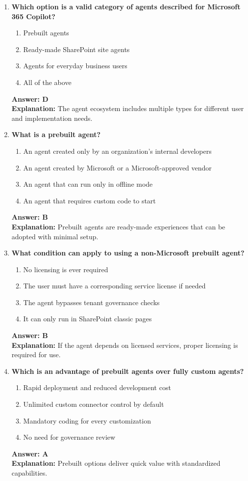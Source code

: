 \documentclass[10pt]{article}
\begin{document}
\begin{enumerate}[leftmargin=*]
\item \textbf{Which option is a valid category of agents described for Microsoft 365 Copilot?}
\begin{enumerate}[label=\Alph*.]
  \item Prebuilt agents
  \item Ready-made SharePoint site agents
  \item Agents for everyday business users
  \item All of the above
\end{enumerate}
\textbf{Answer: D}\\
\textbf{Explanation:} The agent ecosystem includes multiple types for different user and implementation needs.

\item \textbf{What is a prebuilt agent?}
\begin{enumerate}[label=\Alph*.]
  \item An agent created only by an organization’s internal developers
  \item An agent created by Microsoft or a Microsoft-approved vendor
  \item An agent that can run only in offline mode
  \item An agent that requires custom code to start
\end{enumerate}
\textbf{Answer: B}\\
\textbf{Explanation:} Prebuilt agents are ready-made experiences that can be adopted with minimal setup.

\item \textbf{What condition can apply to using a non-Microsoft prebuilt agent?}
\begin{enumerate}[label=\Alph*.]
  \item No licensing is ever required
  \item The user must have a corresponding service license if needed
  \item The agent bypasses tenant governance checks
  \item It can only run in SharePoint classic pages
\end{enumerate}
\textbf{Answer: B}\\
\textbf{Explanation:} If the agent depends on licensed services, proper licensing is required for use.

\item \textbf{Which is an advantage of prebuilt agents over fully custom agents?}
\begin{enumerate}[label=\Alph*.]
  \item Rapid deployment and reduced development cost
  \item Unlimited custom connector control by default
  \item Mandatory coding for every customization
  \item No need for governance review
\end{enumerate}
\textbf{Answer: A}\\
\textbf{Explanation:} Prebuilt options deliver quick value with standardized capabilities.


\end{enumerate}
\end{document}
